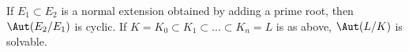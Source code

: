  If $E_1 \subset E_2$ is a normal extension obtained by adding a prime root, then $\Aut(E_2/E_1)$ is cyclic.
 If $K = K_0 \subset K_1 \subset \ldots \subset K_n = L$ is as above, $\Aut(L/K)$ is solvable.